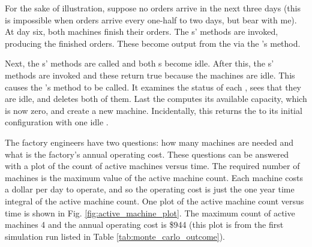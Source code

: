 For the sake of illustration, suppose no orders arrive in the next three days (this is impossible when orders arrive every one-half to two days, but bear with me). At day six, both machines finish their orders. The s'  methods are invoked, producing the finished orders. These become output from the  via the 's  method.

Next, the s'  methods are called and both s become idle. After this, the s'  methods are invoked and these return true because the machines are idle. This causes the 's  method to be called. It examines the status of each , sees that they are idle, and deletes both of them. Last the  computes its available capacity, which is now zero, and create a new machine. Incidentally, this returns the  to its initial configuration with one idle .
 
The factory engineers have two questions: how many machines are needed and what is the factory's annual operating cost. These questions can be answered with a plot of the count of active machines versus time. The required number of machines is the maximum value of the active machine count. Each machine costs a dollar per day to operate, and so the operating cost is just the one year time integral of the active machine count. One plot of the active machine count versus time is shown in Fig. \ref{fig:active_machine_plot}. The maximum count of active machines 4 and the annual operating cost is \$944 (this plot is from the first simulation run listed in Table \ref{tab:monte_carlo_outcome}). 

